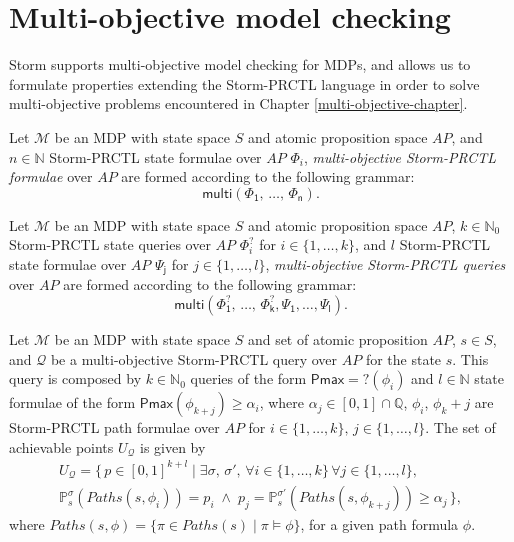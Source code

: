 \section{Multi-objective model checking}\label{mo-mc}

Storm supports multi-objective model checking for MDPs, and allows us to formulate properties extending the Storm-PRCTL language in order to solve multi-objective problems encountered in Chapter \ref{multi-objective-chapter}.

\begin{definition}
  Let $\mathcal{M}$ be an MDP with state space $S$ and atomic proposition space $AP$, and $n \in \mathbb{N}$ Storm-PRCTL state formulae over $AP$ $\mathsf\Phi_i$,
  \textit{multi-objective Storm-PRCTL formulae} over $AP$ are formed according to the following grammar:
  \[
    \mathsf{multi(\Phi_1,\, \dots,\, \Phi_n)}.
  \]
\end{definition}

\begin{definition}
  Let $\mathcal{M}$ be an MDP with state space $S$ and atomic proposition space $AP$, $k \in \mathbb{N}_0$ Storm-PRCTL state queries over $AP$
  $\mathsf\Phi_i^?$ for $i \in \{1, \dots, k\}$, and $l$ Storm-PRCTL state formulae over $AP$
  $\mathsf{\Psi_j}$ for $j \in \{1, \dots, l\}$,
  \textit{multi-objective Storm-PRCTL queries} over $AP$ are formed according to the following grammar:
  \[
    \mathsf{multi(\Phi^?_1,\, \dots,\, \Phi^?_k, \Psi_1, \dots, \Psi_l)}.
  \]
\end{definition}

\begin{definition}
Let $\mathcal{M}$ be an MDP with state space $S$ and set of atomic proposition $AP$, $s \in S$, and $\mathcal{Q}$ be a multi-objective Storm-PRCTL query over $AP$ for the state $s$.
This query is composed by $k \in \mathbb{N}_0$ queries of the form $\mathsf{Pmax=?}(\phi_i)$ and $l \in \mathbb{N}$
state formulae of the form $\mathsf{Pmax}(\phi_{k + j})\geq \alpha_i$, where $\alpha_j \in [0, 1]\cap\mathbb{Q}$, $\phi_i$, $\phi_k+j$ are Storm-PRCTL path formulae over $AP$ for $i \in \{1, \dots, k\}, \, j \in \{1, \dots, l\}$.
  The set of achievable points $U_\mathcal{Q}$ is given by
  \begin{align*}
    U_\mathcal{Q} = \{\, p \in [0, 1]^{k+l} \; | \; \exists \sigma, \, \sigma', \, \forall i \in \{1, \dots, k\} \, \forall j \in \{1, \dots, l\},\\
    \mathbb{P}_s^\sigma(Paths(s, \phi_i)) = p_i \; \wedge \; p_j = \mathbb{P}_s^{\sigma'}(Paths(s, \phi_{k+j})) \geq \alpha_j \, \},
  \end{align*}
  where $Paths(s, \phi) = \{ \pi \in Paths(s) \; | \; \pi \models \phi\}$, for a given path formula $\phi$.
\end{definition}

